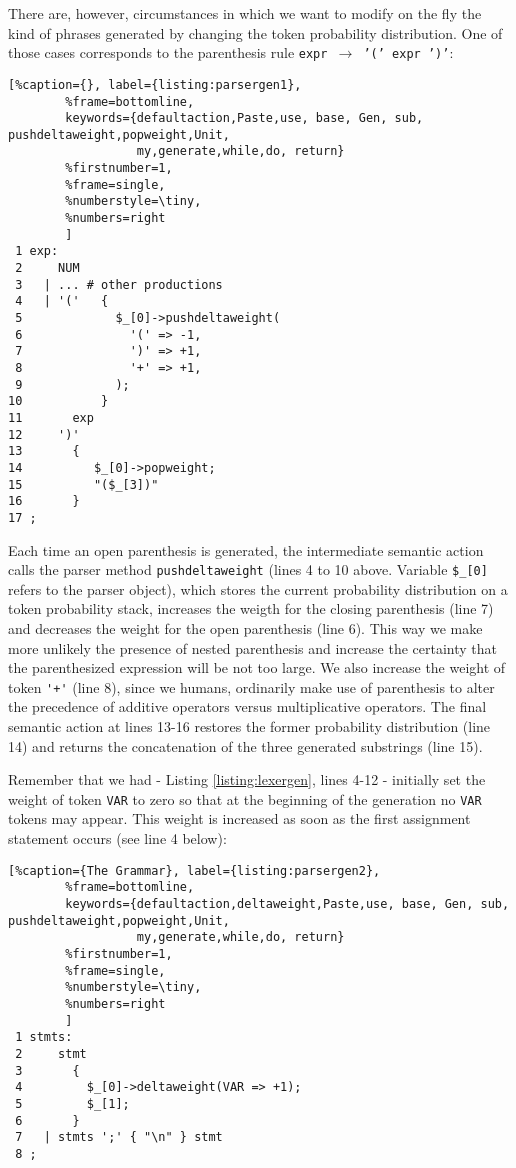 There are, however, circumstances in which we want to modify on the fly
the kind of phrases generated by changing the token probability distribution.
One of those cases corresponds to the parenthesis rule 
\mbox{\tt expr $\rightarrow$ '(' expr ')'}:
\begin{lstlisting}[%caption={}, label={listing:parsergen1}, 
        %frame=bottomline,
        keywords={defaultaction,Paste,use, base, Gen, sub, pushdeltaweight,popweight,Unit,
                  my,generate,while,do, return}
        %firstnumber=1, 
        %frame=single,
        %numberstyle=\tiny,
        %numbers=right
        ]
 1 exp:
 2     NUM                
 3   | ... # other productions 
 4   | '('   { 
 5             $_[0]->pushdeltaweight(
 6               '(' => -1, 
 7               ')' => +1, 
 8               '+' => +1, 
 9             ); 
10           } 
11       exp 
12     ')'
13       {
14          $_[0]->popweight; 
15          "($_[3])"
16       }
17 ;
\end{lstlisting}
Each time an open parenthesis is generated, the intermediate semantic action
calls the parser method \verb|pushdeltaweight| (lines 4 to 10 above. Variable \verb|$_[0]| refers
to the parser object), which stores the current probability
distribution on a token probability stack,
increases the weigth for the closing parenthesis (line 7)
and decreases the weight for the open parenthesis (line 6).
This way we make more unlikely the presence of nested 
parenthesis and increase the certainty that the parenthesized expression
will be not too large.
We also increase the weight of token \verb|'+'| (line 8),
since  we humans,  ordinarily  make use of parenthesis to alter
the precedence of additive operators versus multiplicative 
operators. The final semantic action at lines 13-16 restores the former
probability distribution (line 14) and returns the concatenation of 
the three generated substrings (line 15).

Remember that we had - Listing \ref{listing:lexergen}, lines 4-12 - initially set 
the weight of token \verb|VAR| to zero so that at the beginning 
of the generation no \verb|VAR| tokens may appear.
This weight is increased as soon as the first assignment 
statement occurs (see line 4 below):
\begin{lstlisting}[%caption={The Grammar}, label={listing:parsergen2}, 
        %frame=bottomline,
        keywords={defaultaction,deltaweight,Paste,use, base, Gen, sub, pushdeltaweight,popweight,Unit,
                  my,generate,while,do, return}
        %firstnumber=1, 
        %frame=single,
        %numberstyle=\tiny,
        %numbers=right
        ]
 1 stmts:
 2     stmt
 3       {
 4         $_[0]->deltaweight(VAR => +1); 
 5         $_[1];
 6       }
 7   | stmts ';' { "\n" } stmt 
 8 ;
\end{lstlisting}

